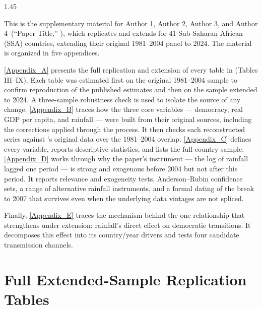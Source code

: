 \documentclass[12pt]{article}
\newcommand{\papertitle}{Paper Title}
\newcommand{\paperauthorsprose}{Author 1, Author 2, Author 3, and Author 4}
\begin{document}
\begin{bibunit}[jpe]
\begin{spacing}{1.45}

\noindent This is the supplementary material for \paperauthorsprose\ (``\papertitle,'' \the\year), which replicates and extends \citet{bruckner2011rain} for 41 Sub-Saharan African (SSA) countries, extending their original 1981--2004 panel to 2024. The material is organized in five appendices. 

\ref{Appendix_A} presents the full replication and extension of every table in \citet{bruckner2011rain} (Tables III--IX). Each table was estimated first on the original 1981--2004 sample to confirm reproduction of the published estimates and then on the sample extended to 2024. A three-sample robustness check is used to isolate the source of any change. 
\ref{Appendix_B} traces how the three core variables --- democracy, real GDP per capita, and rainfall --- were built from their original sources, including the corrections applied through the process. It then checks each reconstructed series against \citeauthor{bruckner2011rain}'s original data over the 1981--2004 overlap.
\ref{Appendix_C} defines every variable, reports descriptive statistics, and lists the full country sample. \ref{Appendix_D} works through why the paper's instrument --- the log of rainfall lagged one period --- is strong and exogenous before 2004 but not after this period. It reports relevance and exogeneity tests, Anderson--Rubin confidence sets, a range of alternative rainfall instruments, and a formal dating of the break to 2007 that survives even when the underlying data vintages are not spliced.

Finally, \ref{Appendix_E} traces the mechanism behind the one relationship that strengthens under extension: rainfall's direct effect on democratic transitions. It decomposes this effect into its country/year drivers and tests four candidate transmission channels.

\section{Full Extended-Sample Replication Tables\label{Appendix_A}}


\end{spacing}
\end{bibunit}
\end{document}
